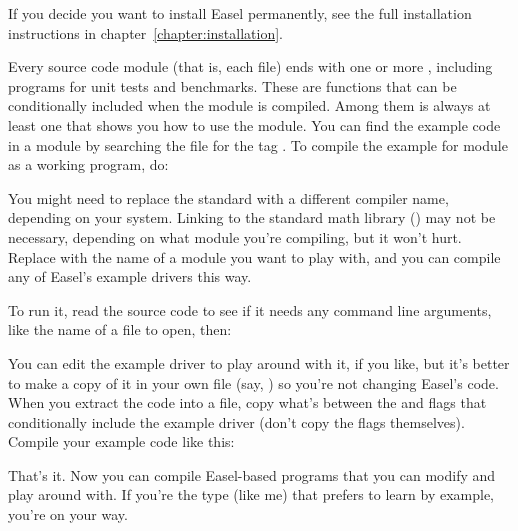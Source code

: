 If you decide you want to install Easel permanently, see the full
installation instructions in chapter~\ref{chapter:installation}.

Every source code module (that is, each  file) ends with one
or more , including programs for unit tests
and benchmarks. These are  functions that can be
conditionally included when the module is compiled. Among them is
always at least one  that shows you how to use
the module. You can find the example code in a module  by
searching the  file for the tag
. To compile the example for module
 as a working program, do:

\begin{cchunk}
\end{cchunk}

You might need to replace the standard  with a different
compiler name, depending on your system. Linking to the standard math
library () may not be necessary, depending on what module
you're compiling, but it won't hurt. Replace  with the name
of a module you want to play with, and you can compile any of Easel's
example drivers this way.

To run it, read the source code to see if it needs any command line
arguments, like the name of a file to open, then:

\begin{cchunk}
\end{cchunk}

You can edit the example driver to play around with it, if you like,
but it's better to make a copy of it in your own file (say,
) so you're not changing Easel's code. When you
extract the code into a file, copy what's between the  and  flags that
conditionally include the example driver (don't copy the flags
themselves).  Compile your example code like this:

\begin{cchunk}
\end{cchunk}

That's it. Now you can compile Easel-based programs that you can
modify and play around with. If you're the type (like me) that prefers
to learn by example, you're on your way.  

